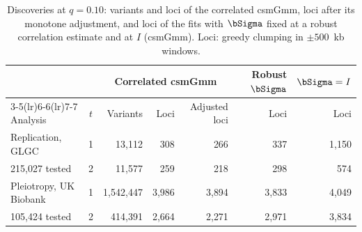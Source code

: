 \begin{table}[!htbp]
\centering
\caption{Discoveries at $q=0.10$: variants and loci of the correlated csmGmm, loci after its monotone adjustment, and loci of the fits with $\bSigma$ fixed at a robust correlation estimate and at $I$ (csmGmm). Loci: greedy clumping in $\pm500$~kb windows.}\label{tab:realdata}
\small
\begin{tabular}{lc rr r rr}
\toprule
 & & \multicolumn{3}{c}{Correlated csmGmm} & Robust $\bSigma$ & $\bSigma=I$\\
\cmidrule(lr){3-5}\cmidrule(lr){6-6}\cmidrule(lr){7-7}
Analysis & $t$ & Variants & Loci & Adjusted loci & Loci & Loci\\
\midrule
Replication, GLGC & 1 & 13{,}112 & 308 & 266 & 337 & 1{,}150\\
\quad 4{,}215{,}027 tested & 2 & 11{,}577 & 259 & 218 & 298 & 574\\
Pleiotropy, UK Biobank & 1 & 1{,}542{,}447 & 3{,}986 & 3{,}894 & 3{,}833 & 4{,}049\\
\quad 9{,}105{,}424 tested & 2 & 414{,}391 & 2{,}664 & 2{,}271 & 2{,}971 & 3{,}834\\
\bottomrule
\end{tabular}
\end{table}
